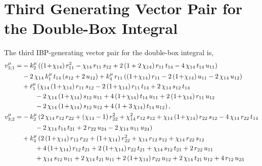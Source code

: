 \documentclass[aps,prd,preprint,groupedaddress,nofootinbib,showpacs,eqsecnum]{revtex4}
\begin{document}
\newpage
\appendix
\section{Third Generating Vector Pair for the Double-Box Integral}
\label{MasslessDoubleBoxVector3Appendix}
	
The third IBP-generating vector pair for the double-box integral is,
\begin{equation}
\begin{aligned}
v_{3;1}^\mu =&
-k_{2}^\mu\,((1\!+\!\chi_{14})\,r_{11}^{2}-\chi_{14}\,r_{11}\,s_{12}
+2\,(1+2\,\chi_{14})\,r_{11}\,t_{14}
-4\,\chi_{14}\,t_{14}\,u_{11})
\\ &
-2\,\chi_{14}\,k_{1}^\mu\,t_{14}\,(s_{12}+2\,u_{12})
+k_{4}^\mu\,r_{11}\,((1\!+\!\chi_{14})\,r_{11}-2\,(1\!+\!\chi_{14})\,u_{11}
-2\,\chi_{14}\,u_{12})
\\ &
+\ell_1^\mu\,(\chi_{14}\,(1\!+\!\chi_{14})\,r_{11}\,s_{12}
-2\,(1\!+\!\chi_{14})\,r_{11}\,t_{14}
+2\,\chi_{14}\,s_{12}\,t_{14}
\\ &\hspace*{7mm}
-2\,\chi_{14}\,(1\!+\!\chi_{14})\,s_{12}\,u_{11}
+4\,(1\!+\!\chi_{14})\,t_{14}\,u_{11}
+2\,(1\!+\!\chi_{14})\,r_{11}\,u_{12}
\\ &\hspace*{7mm}
-2\,\chi_{14}\,(1\!+\!\chi_{14})\,s_{12}\,u_{12}
+4\,(1+3\,\chi_{14})\,t_{14}\,u_{12})
\,,\\
%
v_{3;2}^\mu =&
-k_{2}^\mu\,(2\,\chi_{14}\,r_{12}\,r_{22}
+(\chi_{14}-1)\,r_{22}^{2}
+\chi_{14}^{2}\,r_{12}\,s_{12}
+\chi_{14}\,(1\!+\!\chi_{14})\,r_{22}\,s_{12}
-4\,\chi_{14}\,r_{22}\,t_{14}
\\ &\hspace*{7mm}
-2\,\chi_{14}\,t_{14}\,t_{21}+2\,r_{22}\,u_{24}
-2\,\chi_{14}\,u_{11}\,u_{24})
\\ &
+k_{4}^\mu\,(2\,(1\!+\!\chi_{14})\,r_{12}\,r_{22}
+(1\!+\!\chi_{14})\,r_{22}^{2}
+\chi_{14}\,r_{12}\,s_{12}
+\chi_{14}\,r_{22}\,s_{12}
\\ &\hspace*{7mm}
+4\,(1\!+\!\chi_{14})\,r_{12}\,t_{21}
+2\,(1\!+\!\chi_{14})\,r_{22}\,t_{21}
+\chi_{14}\,s_{12}\,t_{21}+2\,r_{22}\,u_{11}
\\ &\hspace*{7mm}
+\chi_{14}\,s_{12}\,u_{11}
+2\,\chi_{14}\,t_{21}\,u_{11}
+2\,(1\!+\!\chi_{14})\,r_{22}\,u_{12}
+2\,\chi_{14}\,t_{21}\,u_{12}+4\,r_{12}\,u_{23}
\\ &\hspace*{7mm}

\end{aligned}
\end{equation}
\end{document}
